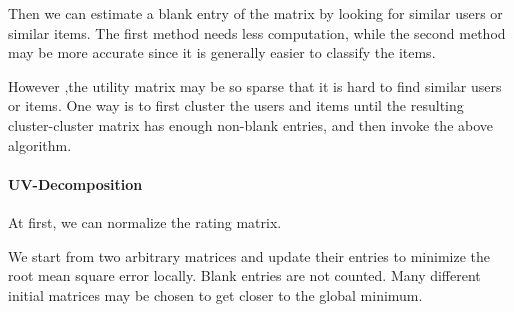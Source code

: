 \documentclass{article}
\begin{document}
Then we can estimate a blank entry of the matrix by looking for similar users or similar items. The first method needs less computation, while the second method may be more accurate since it is generally easier to classify the items.

However ,the utility matrix may be so sparse that it is hard to find similar users or items. One way is to first cluster the users and items until the resulting cluster-cluster matrix has enough non-blank entries, and then invoke the above algorithm.

\paragraph{UV-Decomposition}
At first, we can normalize the rating matrix.

We start from two arbitrary matrices and update their entries to minimize the root mean square error locally. Blank entries are not counted. Many different initial matrices may be chosen to get closer to the global minimum.
\end{document}
